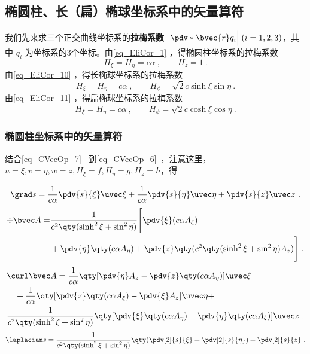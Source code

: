 \subsection{椭圆柱、长（扁）椭球坐标系中的矢量算符}
我们先来求三个正交曲线坐标系的\textbf{拉梅系数} $\Big|\pdv*{\bvec{r}}{q_i}\Big|\;(i=1,2,3)$，其中 $q_i$ 为坐标系的3个坐标。由\autoref{eq_EliCor_1} ，得椭圆柱坐标系的拉梅系数
\begin{equation}
H_\xi=H_\eta=c\alpha ~,\quad \quad H_z=1~.
\end{equation}
由\autoref{eq_EliCor_10} ，得长椭球坐标系的拉梅系数
\begin{equation}
H_\xi=H_\eta=c\alpha~, \quad \quad H_\phi=\sqrt{2}c\sinh\xi\sin\eta~.
\end{equation}
由\autoref{eq_EliCor_11} ，得扁椭球坐标系的拉梅系数
\begin{equation}
H_\xi=H_\eta=c\alpha ~,\quad \quad H_\phi=\sqrt{2}c\cosh\xi\cos\eta~.
\end{equation}
\subsubsection{椭圆柱坐标系中的矢量算符}
结合\autoref{eq_CVecOp_7}~ 到\autoref{eq_CVecOp_6}~，注意这里，$u=\xi,v=\eta,w=z,H_\xi=f,H_\eta=g,H_z=h$，得

\begin{equation}
\grad s = \frac{1}{c\alpha} \pdv{s}{\xi}\uvec \xi + \frac{1}{c\alpha}\pdv{s}{\eta} \uvec \eta +  \pdv{s}{z}\uvec z~.
\end{equation}
\begin{equation}
\begin{aligned}
\div \bvec A = &\frac{1}{c^2\qty(\sinh^2\xi+\sin^2\eta)}\Bigg[\pdv{\xi}(c\alpha A_\xi) \\&+ \pdv{\eta}\qty(c\alpha A_\eta) + \pdv{z}\qty(c^2\qty(\sinh^2\xi+\sin^2\eta)A_z)\Bigg]~.
\end{aligned}
\end{equation}
\begin{equation}
\begin{aligned}
&\curl \bvec A = \frac{1}{c\alpha}\qty[\pdv{\eta}A_z - \pdv{z}\qty(c\alpha A_\eta)]\uvec \xi\\
&\quad + \frac{1}{c\alpha}\qty[\pdv{z}\qty(c\alpha A_\xi) - \pdv{\xi}A_z]\uvec \eta
+ \\
&\frac{1}{c^2\qty(\sinh^2\xi+\sin^2\eta)}\qty[\pdv{\xi}\qty(c\alpha A_\eta) - \pdv{\eta}\qty(c\alpha A_\xi)]\uvec z~.
\end{aligned}
\end{equation}
\begin{equation}
\laplacian s = \frac{1}{c^2\qty(\sinh^2\xi+\sin^2\eta)}\qty(\pdv[2]{s}{\xi} + \pdv[2]{s}{\eta} )+ \pdv[2]{s}{z}~.
\end{equation}

